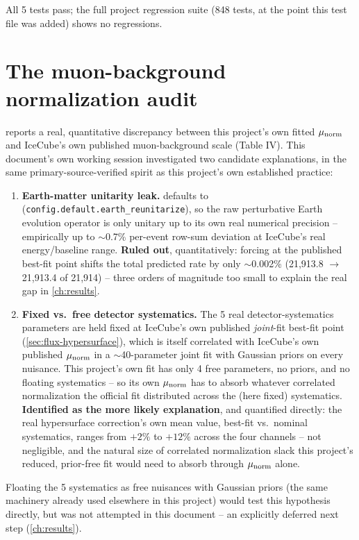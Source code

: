 \begin{resultbox}
All 5 tests pass; the full project regression suite (848 tests, at the
point this test file was added) shows no regressions.
\end{resultbox}

\section{The muon-background normalization audit}
\label{sec:munorm-audit}

\begin{theorybox}
 reports a real, quantitative discrepancy between this
project's own fitted $\mu_{\rm norm}$ and IceCube's own published
muon-background scale (Table IV). This document's own working session
investigated two candidate explanations, in the same primary-source-verified
spirit as this project's own established practice:
\begin{enumerate}
  \item \textbf{Earth-matter unitarity leak.}
     defaults to
     (\texttt{config.default.earth\_reunitarize}),
    so the raw perturbative Earth evolution operator is only unitary up to
    its own real numerical precision -- empirically up to $\sim$0.7\%
    per-event row-sum deviation at IceCube's real energy/baseline range.
    \textbf{Ruled out}, quantitatively: forcing  at
    the published best-fit point shifts the total predicted rate by only
    $\sim$0.002\% (21{,}913.8 $\to$ 21{,}913.4 of 21{,}914) -- three orders
    of magnitude too small to explain the real gap in \cref{ch:results}.
  \item \textbf{Fixed vs.\ free detector systematics.} The 5 real
    detector-systematics parameters are held fixed at IceCube's own
    published \emph{joint}-fit best-fit point (\cref{sec:flux-hypersurface}),
    which is itself correlated with IceCube's own published $\mu_{\rm norm}$
    in a $\sim$40-parameter joint fit with Gaussian priors on every
    nuisance. This project's own fit has only 4 free parameters, no
    priors, and no floating systematics -- so its own $\mu_{\rm norm}$ has
    to absorb whatever correlated normalization the official fit
    distributed across the (here fixed) systematics. \textbf{Identified as
    the more likely explanation}, and quantified directly: the real
    hypersurface correction's own mean value, best-fit vs.\ nominal
    systematics, ranges from $+2\%$ to $+12\%$ across the four channels
    -- not negligible, and the natural size of correlated normalization
    slack this project's reduced, prior-free fit would need to absorb
    through $\mu_{\rm norm}$ alone.
\end{enumerate}
Floating the 5 systematics as free nuisances with Gaussian priors (the
same  machinery already used elsewhere in
this project) would test this hypothesis directly, but was not attempted
in this document -- an explicitly deferred next step
(\cref{ch:results}).
\end{theorybox}
